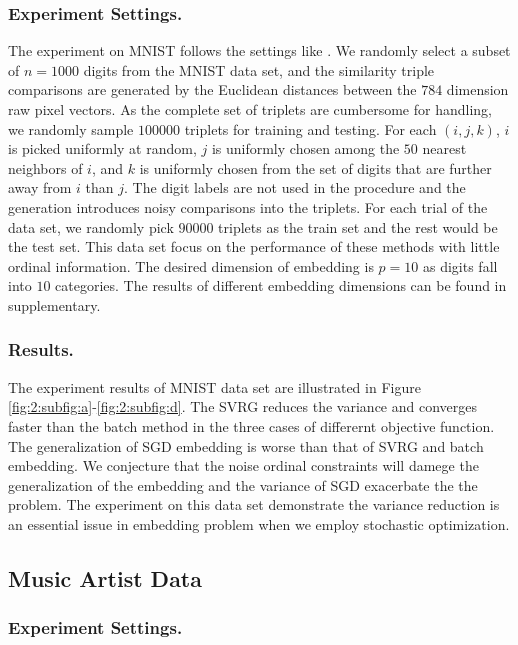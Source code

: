 \documentclass[letterpaper]{article}
\begin{document}
		\subsubsection{Experiment Settings.}
		The experiment on MNIST follows the settings like \cite{vandermaaten2012stochastic}. We randomly select a subset of $n=1000$ digits from the MNIST data set, and the similarity triple comparisons are generated by the Euclidean distances between the $784$ dimension raw pixel vectors. As the complete set of triplets are cumbersome for handling, we randomly sample $100000$ triplets for training and testing. For each $(i, j, k)$, $i$ is picked uniformly at random, $j$ is uniformly chosen among the $50$ nearest neighbors of $i$, and $k$ is uniformly chosen from the set of digits that are further away from $i$ than $j$. The digit labels are not used in the procedure and the generation introduces noisy comparisons into the triplets. For each trial of the data set, we randomly pick $90000$ triplets as the train set and the rest would be the test set. This data set focus on the performance of these methods with little ordinal information. The desired dimension of embedding is $p = 10$ as digits fall into $10$ categories. The results of different embedding dimensions can be found in supplementary. 

		\subsubsection{Results.}

		The experiment results of MNIST data set are illustrated in Figure \ref{fig:2:subfig:a}-\ref{fig:2:subfig:d}. The SVRG reduces the variance and  converges faster than the batch method in the three cases of differernt objective function. The generalization of SGD embedding is worse than that of SVRG and batch embedding. We conjecture that the noise ordinal constraints will damege the generalization of the embedding and the variance of SGD exacerbate the the problem. The experiment on this data set demonstrate the variance reduction is an essential issue in embedding problem when we employ stochastic optimization.

		\subsection{Music Artist Data}

		\subsubsection{Experiment Settings.}
\end{document}
